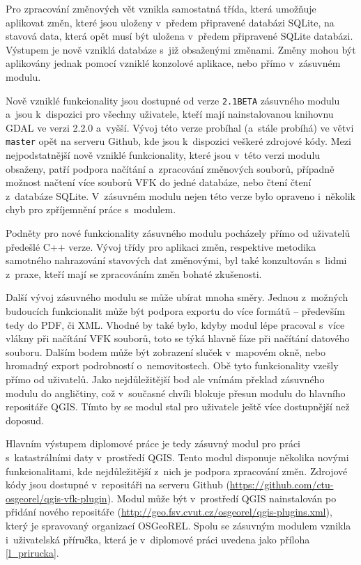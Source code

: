 \documentclass[a4paper,12pt,oneside]{book}
\begin{document}
Pro zpracování změnových vět vznikla samostatná třída, která umožňuje
aplikovat změn, které jsou uloženy v~předem připravené databázi
SQLite, na stavová data, která opět musí být uložena v~předem
připravené SQLite databázi. Výstupem je nově vzniklá databáze s~již
obsaženými změnami. Změny mohou být aplikovány jednak pomocí vzniklé
konzolové aplikace, nebo přímo v~zásuvném modulu.

Nově vzniklé funkcionality jsou dostupné od verze \texttt{2.1BETA}
zásuvného modulu a~jsou k~dispozici pro všechny uživatele, kteří mají
nainstalovanou knihovnu GDAL ve verzi 2.2.0 a~vyšší. Vývoj této verze
probíhal (a~stále probíhá) ve větvi \texttt{master} opět na serveru
Github, kde jsou k~dispozici veškeré zdrojové kódy. Mezi
nejpodstatnější nově vzniklé funkcionality, které jsou v~této verzi
modulu obsaženy, patří podpora načítání a~zpracování změnových
souborů, případně možnost načtení více souborů VFK do jedné databáze,
nebo čtení čtení z~databáze SQLite. V~zásuvném modulu nejen této verze
bylo opraveno i~několik chyb pro zpříjemnění práce s~modulem.

Podněty pro nové funkcionality zásuvného modulu pocházely přímo od
uživatelů předešlé C++ verze. Vývoj třídy pro aplikaci změn,
respektive metodika samotného nahrazování stavových dat změnovými, byl
také konzultován s~lidmi z~praxe, kteří mají se zpracováním změn
bohaté zkušenosti.

Další vývoj zásuvného modulu se může ubírat mnoha směry. Jednou
z~možných budoucích funkcionalit může být podpora exportu do více
formátů -- především tedy do PDF, či XML. Vhodné by také bylo, kdyby
modul lépe pracoval s~více vlákny při načítání VFK souborů, toto se
týká hlavně fáze při načítání datového souboru. Dalším bodem může být
zobrazení sluček v~mapovém okně, nebo hromadný export podrobností
o~nemovitostech. Obě tyto funkcionality vzešly přímo od
uživatelů. Jako nejdůležitější bod ale vnímám překlad zásuvného modulu
do angličtiny, což v~současné chvíli blokuje přesun modulu do hlavního
repositáře QGIS. Tímto by se modul stal pro uživatele ještě více
dostupnější než doposud.

Hlavním výstupem diplomové práce je tedy zásuvný modul pro práci
s~katastrálními daty v~prostředí QGIS. Tento modul disponuje několika
novými funkcionalitami, kde nejdůležitější z~nich je podpora
zpracování změn. Zdrojové kódy jsou dostupné v~repositáři na serveru
Github (\url{https://github.com/ctu-osgeorel/qgis-vfk-plugin}). Modul
může být v~prostředí QGIS nainstalován po přidání nového repositáře
(\url{http://geo.fsv.cvut.cz/osgeorel/qgis-plugins.xml}), který je
spravovaný organizací OSGeoREL. Spolu se zásuvným modulem vznikla
i~uživatelská příručka, která je v~diplomové práci uvedena jako
příloha \ref{l_prirucka}.
\end{document}
